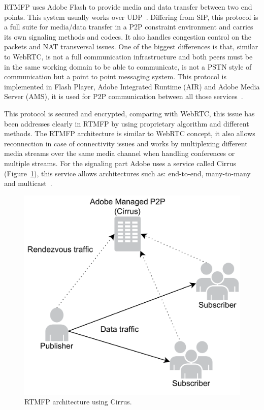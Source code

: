 RTMFP uses Adobe Flash to provide media and data transfer between two end points. This system usually works over UDP~\cite{rtmfpDraft}. Differing from SIP, this protocol is a full suite for media/data transfer in a P2P constraint environment and carries its own signaling methods and codecs. It also handles congestion control on the packets and NAT transversal issues. One of the biggest differences is that, similar to WebRTC, is not a full communication infrastructure and both peers must be in the same working domain to be able to communicate, is not a PSTN style of communication but a point to point messaging system. This protocol is implemented in Flash Player, Adobe Integrated Runtime (AIR) and Adobe Media Server (AMS), it is used for P2P communication between all those services~\cite{rtmfpDraft}. 

This protocol is secured and encrypted, comparing with WebRTC, this issue has been addresses clearly in RTMFP by using proprietary algorithm and different methods. The RTMFP architecture is similar to WebRTC concept, it also allows reconnection in case of connectivity issues and works by multiplexing different media streams over the same media channel when handling conferences or multiple streams. For the signaling part Adobe uses a service called Cirrus (Figure~\ref{fig:RTMFParchitecture}), this service allows architectures such as: end-to-end, many-to-many and multicast~\cite{cirrusFAQ}.
 
 \begin{figure}[h]
  \centering
    \includegraphics[scale=0.4]{./figures/cirrusAdobe.pdf}
      \caption[RTMFP architecture using Cirrus]{RTMFP architecture using Cirrus.}
	\label{fig:RTMFParchitecture}
\end{figure}
 
